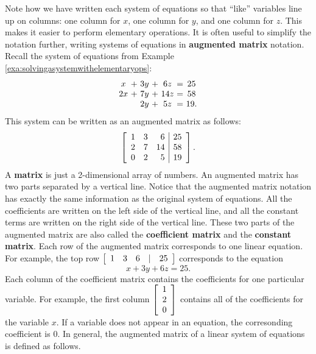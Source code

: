 Note how we have written each system of equations so that ``like''
variables line up on columns: one column for $x$, one column for $y$,
and one column for $z$. This makes it easier to perform elementary
operations. It is often useful to simplify the notation further,
writing systems of equations in \textbf{augmented matrix}
 notation. Recall the
system of equations from Example \ref{exa:solvingasystemwithelementaryops}:
\begin{equation*}
\begin{array}{c@{~}c@{~}c@{~}c@{~}c@{~}c@{~}c}
x&+&3y&+&6z&=&25 \\
2x&+&7y&+&14z&=&58 \\
&&2y&+&5z&=&19.
\end{array}
\end{equation*}
This system can be written as an augmented matrix as follows:
\begin{equation*}
\left[ 
\begin{array}{rrr|r}
1 & 3 & 6 & 25 \\
2 & 7 & 14 & 58 \\
0 & 2 & 5 & 19
\end{array}
\right].
\end{equation*}
A \textbf{matrix} is just a 2-dimensional array of
numbers. An augmented matrix has two parts separated by a vertical
line. Notice that the augmented matrix notation has exactly the same
information as the original system of equations. All the coefficients
are written on the left side of the vertical line, and all the
constant terms are written on the right side of the vertical
line. These two parts of the augmented matrix are also called the
\textbf{coefficient matrix} and the \textbf{constant
  matrix}.  Each
row of the augmented matrix corresponds to one linear equation. For example,
the top row $\left[
\begin{array}{rrrrr}
1 & 3 & 6 & | & 25
\end{array}
\right]$
 corresponds to the equation
\begin{equation*}
x+3y+6z=25.
\end{equation*}
Each column of the coefficient matrix contains the coefficients
for one particular variable. For example, the first column $\left[
\begin{array}{r}
1 \\
2 \\
0
\end{array}
\right]$ contains all of the coefficients for the variable $x$. If a
variable does not appear in an equation, the corresonding coefficient
is $0$. In general, the augmented matrix of a linear system of
equations is defined as follows.

